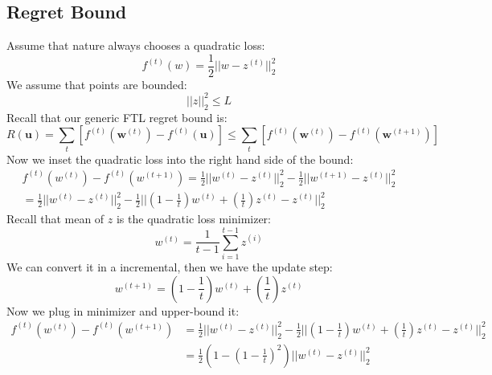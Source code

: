 \documentclass[11pt]{article}
\begin{document}
\subsection{Regret Bound}  
Assume that nature always chooses a quadratic loss:\\
\begin{equation*}
    f^{(t)}(w) = \frac{1}{2}||w - z^{(t)}||_2^2
\end{equation*}
We assume that points are bounded:\\
\begin{equation*}
    ||z||^2_2 \leq L
\end{equation*}
Recall that our generic FTL regret bound is:\\
\begin{equation*}
    R(\bm{u}) = \sum_{t}[f^{(t)}(\bm{w}^{(t)}) - f^{(t)}(\bm{u})] \leq \sum_{t}[f^{(t)}(\bm{w}^{(t)}) - f^{(t)}(\bm{w}^{(t+1)})]
\end{equation*}
Now we inset the quadratic loss into the right hand side of the bound:\\
\begin{equation*}
\begin{aligned}
     f^{(t)}(w^{(t)}) - f^{(t)}(w^{(t+1)}) = \frac{1}{2}||w^{(t)} - z^{(t)}||_2^2 - \frac{1}{2}||w^{(t+1)} - z^{(t)}||_2^2 \\ = \frac{1}{2}||w^{(t)} - z^{(t)}||_2^2 - \frac{1}{2}||(1-\frac{1}{t})w^{(t)} + (\frac{1}{t})z^{(t)} - z^{(t)}||_2^2
\end{aligned}
\end{equation*}
Recall that mean of $z$ is the quadratic loss minimizer:\\
\begin{equation*}
    w^{(t)} = \frac{1}{t-1}\sum^{t-1}_{i=1}z^{(i)}
\end{equation*}
We can convert it in a incremental, then we have the update step:\\
\begin{equation*}
    w^{(t+1)} = (1-\frac{1}{t})w^{(t)} + (\frac{1}{t})z^{(t)}
\end{equation*}
Now we plug in minimizer and upper-bound it:\\
\begin{equation*}
\begin{aligned}
     f^{(t)}(w^{(t)}) - f^{(t)}(w^{(t+1)}) &= \frac{1}{2}||w^{(t)} - z^{(t)}||_2^2 - \frac{1}{2}||(1-\frac{1}{t})w^{(t)} + (\frac{1}{t})z^{(t)} - z^{(t)}||_2^2 \\ 
     &= \frac{1}{2}\left(1 - (1 - \frac{1}{t})^2\right)||w^{(t)} - z^{(t)}||_2^2
\end{aligned}
\end{equation*}
\end{document}
